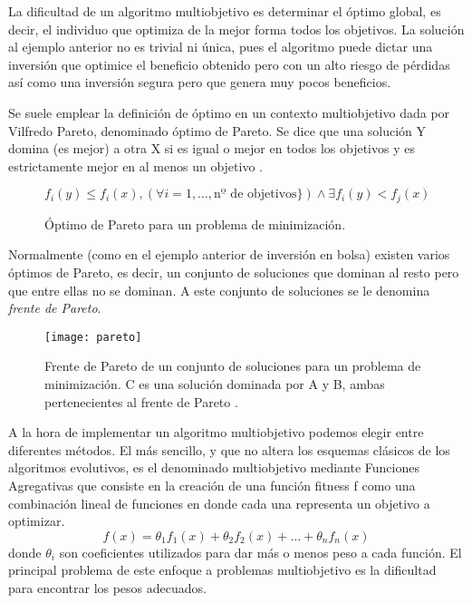 La dificultad de un algoritmo multiobjetivo es determinar el óptimo global, es decir, el individuo que optimiza de la mejor forma todos los objetivos. La solución al ejemplo anterior no es trivial ni única, pues el algoritmo puede dictar una inversión que optimice el beneficio obtenido pero con un alto riesgo de pérdidas así como una inversión segura pero que genera muy pocos beneficios.

\blankline

Se suele emplear la definición de óptimo en un contexto multiobjetivo dada por Vilfredo Pareto, denominado óptimo de Pareto. Se dice que una solución Y domina (es mejor) a otra X si es igual o mejor en todos los objetivos y es estrictamente mejor en al menos un objetivo \cite{cervigon09}.
\begin{figure}[H]
\begin{equation}
f_i(y) \leq f_i(x), (\forall i = 1, \dots, \textrm{nº de objetivos}\}) \wedge \exists f_i(y) < f_j(x)
\end{equation}
\caption{Óptimo de Pareto para un problema de minimización.}
\end{figure}

Normalmente (como en el ejemplo anterior de inversión en bolsa) existen varios óptimos de Pareto, es decir, un conjunto de soluciones que dominan al resto pero que entre ellas no se dominan. A este conjunto de soluciones se le denomina \textit{frente de Pareto}.

\begin{figure}[H]
\centering
\texttt{[image: pareto]}
\caption{Frente de Pareto de un conjunto de soluciones para un problema de minimización. C es una solución dominada por A y B, ambas pertenecientes al frente de Pareto \cite{pictPareto}.}
\end{figure}

A la hora de implementar un algoritmo multiobjetivo podemos elegir entre diferentes  métodos. El más sencillo, y que no altera los esquemas clásicos de los algoritmos evolutivos, es el denominado multiobjetivo mediante Funciones Agregativas que consiste en la creación de una función fitness f como una combinación lineal de funciones en donde cada una representa un objetivo a optimizar.
\begin{equation}
f(x) = \theta_1f_1(x) + \theta_2f_2(x) + \dots + \theta_nf_n(x)
\end{equation}
donde $\theta_i$ son coeficientes utilizados para dar más o menos peso a cada función. El principal problema de este enfoque a problemas multiobjetivo es la dificultad para encontrar los pesos adecuados.

